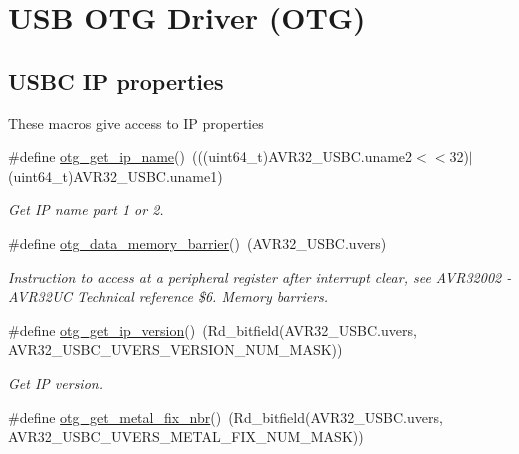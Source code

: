 \hypertarget{group__otg__group}{
\section{\-U\-S\-B \-O\-T\-G \-Driver (\-O\-T\-G)}
\label{group__otg__group}
}
\subsection*{\-U\-S\-B\-C \-I\-P properties}
\label{_amgrp4ec4dc4c51d9d708aedf03b334b1cf86}%
 \-These macros give access to \-I\-P properties \begin{DoxyCompactItemize}
\item 
\#define \hyperlink{group__otg__group_ga276fd7e676117783fc8d3a45aeda3351}{otg\-\_\-get\-\_\-ip\-\_\-name}()~(((uint64\-\_\-t)\-A\-V\-R32\-\_\-\-U\-S\-B\-C.\-uname2$<$$<$32)$|$(uint64\-\_\-t)\-A\-V\-R32\-\_\-\-U\-S\-B\-C.\-uname1)
\begin{DoxyCompactList}\small\item\em \-Get \-I\-P name part 1 or 2. \end{DoxyCompactList}\item 
\#define \hyperlink{group__otg__group_ga60eb9bc13cc48c77512db1849b54c4eb}{otg\-\_\-data\-\_\-memory\-\_\-barrier}()~(\-A\-V\-R32\-\_\-\-U\-S\-B\-C.\-uvers)
\begin{DoxyCompactList}\small\item\em \-Instruction to access at a peripheral register after interrupt clear, see \-A\-V\-R32002 -\/ \-A\-V\-R32\-U\-C \-Technical reference \$6. \-Memory barriers. \end{DoxyCompactList}\item 
\#define \hyperlink{group__otg__group_ga44d71ccfd479392e4bbfd49057c4bf32}{otg\-\_\-get\-\_\-ip\-\_\-version}()~(\-Rd\-\_\-bitfield(\-A\-V\-R32\-\_\-\-U\-S\-B\-C.\-uvers, \-A\-V\-R32\-\_\-\-U\-S\-B\-C\-\_\-\-U\-V\-E\-R\-S\-\_\-\-V\-E\-R\-S\-I\-O\-N\-\_\-\-N\-U\-M\-\_\-\-M\-A\-S\-K))
\begin{DoxyCompactList}\small\item\em \-Get \-I\-P version. \end{DoxyCompactList}\item 
\#define \hyperlink{group__otg__group_ga9ed10ed0cd9edede61a871d74b1d6859}{otg\-\_\-get\-\_\-metal\-\_\-fix\-\_\-nbr}()~(\-Rd\-\_\-bitfield(\-A\-V\-R32\-\_\-\-U\-S\-B\-C.\-uvers, \-A\-V\-R32\-\_\-\-U\-S\-B\-C\-\_\-\-U\-V\-E\-R\-S\-\_\-\-M\-E\-T\-A\-L\-\_\-\-F\-I\-X\-\_\-\-N\-U\-M\-\_\-\-M\-A\-S\-K))
$$
\end{DoxyCompactItemize}
